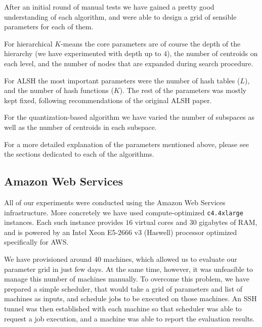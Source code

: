         After an initial round of manual tests we have gained a pretty good understanding of
        each algorithm, and were able to design a grid of sensible parameters for each of them.

        For hierarchical $K$-means the core parameters are of course the depth of the hierarchy
        (we have experimented with depth up to $4$), the number of centroids on each level,
        and the number of nodes that are expanded during search procedure.

        For ALSH the most important parameters were the number of hash tables ($L$),
        and the number of hash functions ($K$). The rest of the parameters was mostly kept fixed, following 
        recommendations of the original ALSH paper.

        For the quantization-based algorithm we have varied the number of subspaces as well as the number of centroids
        in each subspace.

        For a more detailed explanation of the parameters mentioned above, please see the sections
        dedicated to each of the algorithms.

    \subsection{Amazon Web Services}

        All of our experiments were conducted using the Amazon Web Services infrastructure.
        More concretely we have used compute-optimized \texttt{c4.4xlarge} instances. Each such
        instance provides $16$ virtual cores and $30$ gigabytes of RAM, and is powered
        by an Intel Xeon E5-2666 v3 (Haswell) processor optimized specifically for AWS.

        We have provisioned around $40$ machines, which allowed us to evaluate our parameter grid
        in just few days.
        At the same time, however, it was unfeasible to manage this number of machines manually.
        To overcome this problem, we have prepared a simple scheduler,
        that would take a grid of parameters and list of machines as inputs, and schedule
        jobs to be executed on those machines.
        An SSH tunnel was then established with each machine so that scheduler
        was able to request a job execution, and a machine was able to report the evaluation results.
